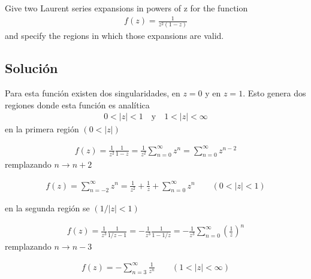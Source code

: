 \begin{problem}{4}
    Give two Laurent series expansions in powers of z for the function
    \begin{gather}
        f(z) = \frac{1}{z^2(1-z)}
    \end{gather}
    and specify the regions in which those expansions are valid.
\end{problem}
\subsection*{Solución}
Para esta función existen dos singularidades, en $z = 0$ y en $z = 1$. Esto genera dos regiones donde esta función es analítica
\begin{gather*}
    0 < |z| < 1 \quad \text{y} \quad 1 < |z|  < \infty
\end{gather*}
en la primera región $(0 < |z|)$

\begin{gather*}
    f(z) = \frac{1}{z^2} \frac{1}{1-z} = \frac{1}{z^2} \sum_{n=0}^{\infty}z^{n} = \sum_{n = 0}^{\infty} z^{n-2}
\end{gather*}
remplazando $n \rightarrow n+2$

\begin{mdframed}
    \vspace{-0.5cm}
    \begin{gather}
        f(z) = \sum_{n = -2}^{\infty} z^{n} = \frac{1}{z^2} + \frac{1}{z} + \sum_{n = 0}^{\infty} z^{n} \qquad (0 < |z| < 1)
    \end{gather}
\end{mdframed}
en la segunda región se $(1/|z| < 1)$

\begin{gather*}
    f(z) = \frac{1}{z^3}\frac{1}{1/z - 1} = -\frac{1}{z^3}\frac{1}{1-1/z} = -\frac{1}{z^3}\sum_{n=0}^{\infty}\left(\frac{1}{z}\right)^{n}
\end{gather*}
remplazando $n \rightarrow n - 3$

\begin{mdframed}
    \vspace{-0.5cm}
    \begin{gather}
        f(z) = - \sum_{n = 3}^{\infty}\frac{1}{z^{n}}  \qquad (1< |z| < \infty)
    \end{gather}
\end{mdframed}
\newpage